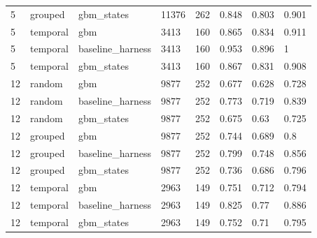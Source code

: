 \begin{tabular}{llllllll}
5 & grouped & gbm\_states & 11376 & 262 & 0.848 & 0.803 & 0.901 \\
5 & temporal & gbm & 3413 & 160 & 0.865 & 0.834 & 0.911 \\
5 & temporal & baseline\_harness & 3413 & 160 & 0.953 & 0.896 & 1 \\
5 & temporal & gbm\_states & 3413 & 160 & 0.867 & 0.831 & 0.908 \\
12 & random & gbm & 9877 & 252 & 0.677 & 0.628 & 0.728 \\
12 & random & baseline\_harness & 9877 & 252 & 0.773 & 0.719 & 0.839 \\
12 & random & gbm\_states & 9877 & 252 & 0.675 & 0.63 & 0.725 \\
12 & grouped & gbm & 9877 & 252 & 0.744 & 0.689 & 0.8 \\
12 & grouped & baseline\_harness & 9877 & 252 & 0.799 & 0.748 & 0.856 \\
12 & grouped & gbm\_states & 9877 & 252 & 0.736 & 0.686 & 0.796 \\
12 & temporal & gbm & 2963 & 149 & 0.751 & 0.712 & 0.794 \\
12 & temporal & baseline\_harness & 2963 & 149 & 0.825 & 0.77 & 0.886 \\
12 & temporal & gbm\_states & 2963 & 149 & 0.752 & 0.71 & 0.795 \\
\bottomrule
\end{tabular}